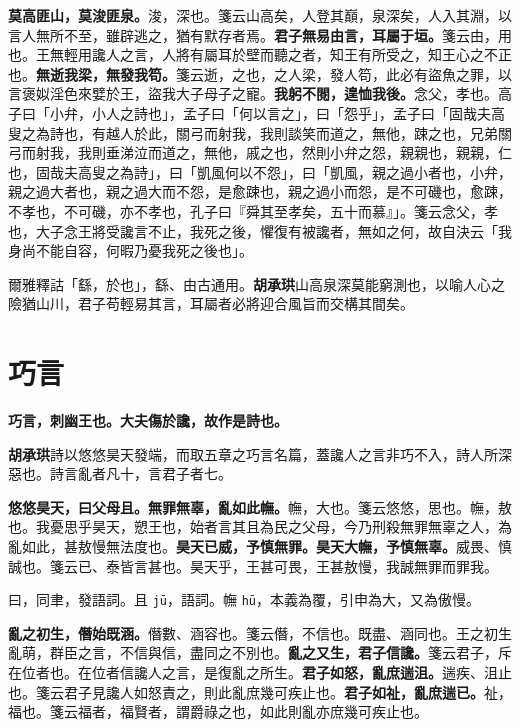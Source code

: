 \textbf{莫高匪山，莫浚匪泉。}{\footnotesize 浚，深也。箋云山高矣，人登其巔，泉深矣，人入其淵，以言人無所不至，雖辟逃之，猶有默存者焉。}\textbf{君子無易由言，耳屬于垣。}{\footnotesize 箋云由，用也。王無輕用讒人之言，人將有屬耳於壁而聽之者，知王有所受之，知王心之不正也。}\textbf{無逝我梁，無發我笱。}{\footnotesize 箋云逝，之也，之人梁，發人笱，此必有盜魚之罪，以言褒姒淫色來嬖於王，盜我大子母子之寵。}\textbf{我躬不閱，遑恤我後。}{\footnotesize 念父，孝也。高子曰「小弁，小人之詩也」，孟子曰「何以言之」，曰「怨乎」，孟子曰「固哉夫高叟之為詩也，有越人於此，關弓而射我，我則談笑而道之，無他，踈之也，兄弟關弓而射我，我則垂涕泣而道之，無他，戚之也，然則小弁之怨，親親也，親親，仁也，固哉夫高叟之為詩」，曰「凱風何以不怨」，曰「凱風，親之過小者也，小弁，親之過大者也，親之過大而不怨，是愈踈也，親之過小而怨，是不可磯也，愈踈，不孝也，不可磯，亦不孝也，孔子曰『舜其至孝矣，五十而慕』」。箋云念父，孝也，大子念王將受讒言不止，我死之後，懼復有被讒者，無如之何，故自決云「我身尚不能自容，何暇乃憂我死之後也」。}

\begin{quoting}爾雅釋詁「繇，於也」，繇、由古通用。\textbf{胡承珙}山高泉深莫能窮測也，以喻人心之險猶山川，君子苟輕易其言，耳屬者必將迎合風旨而交構其間矣。\end{quoting}

\section{巧言}


\textbf{巧言，刺幽王也。大夫傷於讒，故作是詩也。}

\begin{quoting}\textbf{胡承珙}詩以悠悠昊天發端，而取五章之巧言名篇，蓋讒人之言非巧不入，詩人所深惡也。詩言亂者凡十，言君子者七。\end{quoting}

\textbf{悠悠昊天，曰父母且。無罪無辜，亂如此幠。}{\footnotesize 幠，大也。箋云悠悠，思也。幠，敖也。我憂思乎昊天，愬王也，始者言其且為民之父母，今乃刑殺無罪無辜之人，為亂如此，甚敖慢無法度也。}\textbf{昊天已威，予慎無罪。昊天大幠，予慎無辜。}{\footnotesize 威畏、慎誠也。箋云已、泰皆言甚也。昊天乎，王甚可畏，王甚敖慢，我誠無罪而罪我。}

\begin{quoting}曰，同聿，發語詞。且 \texttt{jū}，語詞。幠 \texttt{hū}，本義為覆，引申為大，又為傲慢。\end{quoting}

\textbf{亂之初生，僭始既涵。}{\footnotesize 僭數、涵容也。箋云僭，不信也。既盡、涵同也。王之初生亂萌，群臣之言，不信與信，盡同之不別也。}\textbf{亂之又生，君子信讒。}{\footnotesize 箋云君子，斥在位者也。在位者信讒人之言，是復亂之所生。}\textbf{君子如怒，亂庶遄沮。}{\footnotesize 遄疾、沮止也。箋云君子見讒人如怒責之，則此亂庶幾可疾止也。}\textbf{君子如祉，亂庶遄已。}{\footnotesize 祉，福也。箋云福者，福賢者，謂爵祿之也，如此則亂亦庶幾可疾止也。}

